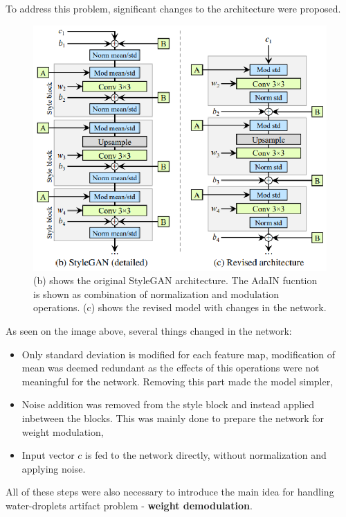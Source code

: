 \documentclass[12pt,a4paper,openany]{book}
\begin{document}
To address this problem, significant changes to the architecture were proposed.

\begin{figure}[ht!]
    \centering
    \includegraphics[scale=1.3]{figs/changed-normalization.eps}
    \caption{(b) shows the original StyleGAN architecture. The AdaIN fucntion is shown as combination of normalization and modulation operations. (c) shows the revised model with changes in the network.}\label{Fig:STYLEGAN}
\end{figure}

As seen on the image above, several things changed in the network:

\begin{itemize}
\item Only standard deviation is modified for each feature map, modification of mean was deemed redundant as the effects of this operations were not meaningful for the network. Removing this part made the model simpler,
\item Noise addition was removed from the style block and instead applied inbetween the blocks. This was mainly done to prepare the network for weight modulation,
\item Input vector $c$ is fed to the network directly, without normalization and applying noise.
\end{itemize}

All of these steps were also necessary to introduce the main idea for handling water-droplets artifact problem - \textbf{weight demodulation}.
\end{document}
